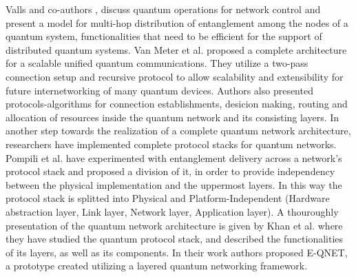 \documentclass[12pt]{ieeetj}
\begin{document}
		Valls and co-authors \cite{brief-intro}, discuss quantum operations for network
		control and present a model for multi-hop distribution of entanglement among the nodes of
		a quantum system, functionalities that need to be efficient for the support of distributed
		quantum systems.
		Van Meter et al. \cite{quantum-arch} proposed a complete architecture 
		for a scalable unified quantum communications. They utilize a two-pass connection setup and recursive protocol
		to allow scalability and extensibility for future internetworking
		of many quantum devices. Authors also presented protocols-algorithms for connection establishments, desicion making, routing and 
		allocation of resources inside the quantum network and its consisting layers.
		In another step towards the realization of a complete quantum network architecture,
		researchers have implemented complete protocol stacks for quantum networks.
		Pompili et al. \cite{pompilli} have experimented with entanglement delivery across 
		a network's protocol stack and proposed a division of it, in order to provide 
		independency between the physical implementation and the uppermost layers. 
		In this way the protocol stack is splitted into Physical and Platform-Independent
		(Hardware abstraction layer, Link layer, Network layer, Application layer).
		A thouroughly presentation of the quantum network architecture is given by Khan et al. \cite{e-qnet}
		where they have studied the quantum protocol stack, and described the functionalities of its layers, as well 
		as its components. In their work authors proposed E-QNET, a prototype created utilizing a layered quantum networking
		framework.
		
		
\end{document}
